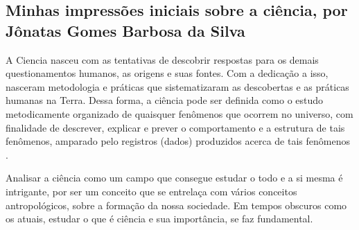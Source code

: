 \subsection{Minhas impressões iniciais sobre a ciência, por Jônatas Gomes Barbosa da Silva}

A \gls{Ciencia} nasceu com as tentativas de descobrir respostas para os demais questionamentos humanos, as origens e suas fontes. Com a dedicação a isso, nasceram \gls{metodologia} e práticas que sistematizaram as descobertas e as práticas humanas na Terra. Dessa forma, a ciência pode ser definida como o estudo metodicamente organizado de quaisquer fenômenos que ocorrem no universo, com finalidade de descrever, explicar e prever o comportamento e a estrutura de tais fenômenos, amparado pelo registros (dados) produzidos acerca de tais fenômenos \citep{fernandes_ciencia_2018}. 

Analisar a ciência como um campo que consegue estudar o todo e a si mesma é intrigante, por ser um conceito que se entrelaça com vários conceitos antropológicos, sobre a formação da nossa sociedade. Em tempos obscuros como os atuais, estudar o que é ciência e sua importância, se faz fundamental.
